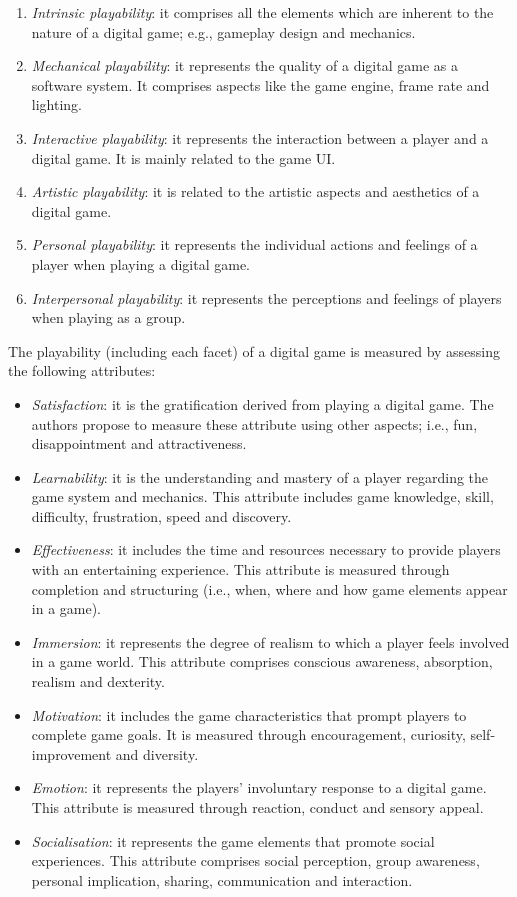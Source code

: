 \begin{enumerate}
    \item \emph{Intrinsic playability}: it comprises all the elements which are inherent to the nature of a digital game; e.g., gameplay design and mechanics.
    \item \emph{Mechanical playability}: it represents the quality of a digital game as a software system. It comprises aspects like the game engine, frame rate and lighting.
    \item \emph{Interactive playability}: it represents the interaction between a player and a digital game. It is mainly related to the game \ac{UI}.
    \item \emph{Artistic playability}: it is related to the artistic aspects and aesthetics of a digital game.
    \item \emph{Personal playability}: it represents the individual actions and feelings of a player when playing a digital game.
    \item \emph{Interpersonal playability}: it represents the perceptions and feelings of players when playing as a group.
\end{enumerate}

The playability (including each facet) of a digital game is measured by assessing the following attributes:

\begin{itemize}
    \item \emph{Satisfaction}: it is the gratification derived from playing a digital game. The authors propose to measure these attribute using other aspects; i.e., fun, disappointment and attractiveness.
    \item \emph{Learnability}: it is the understanding and mastery of a player regarding the game system and mechanics. This attribute includes game knowledge, skill, difficulty, frustration, speed and discovery.
    \item \emph{Effectiveness}: it includes the time and resources necessary to provide players with an entertaining experience. This attribute is measured through completion and structuring (i.e., when, where and how game elements appear in a game).
    \item \emph{Immersion}: it represents the degree of realism to which a player feels involved in a game world. This attribute comprises conscious awareness, absorption, realism and dexterity.
    \item \emph{Motivation}: it includes the game characteristics that prompt players to complete game goals. It is measured through encouragement, curiosity, self-improvement and diversity.
    \item \emph{Emotion}: it represents the players' involuntary response to a digital game. This attribute is measured through reaction, conduct and sensory appeal.
    \item \emph{Socialisation}: it represents the game elements that promote social experiences. This attribute comprises social perception, group awareness, personal implication, sharing, communication and interaction.
\end{itemize}

